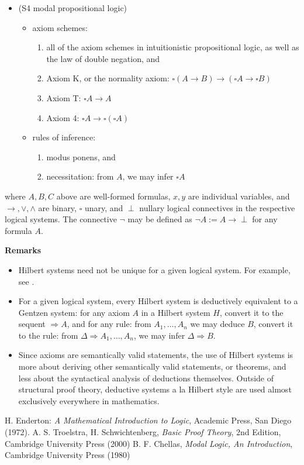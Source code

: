 \documentclass[12pt]{article}
\begin{document}
\begin{itemize}
\begin{itemize}
\begin{enumerate}
\end{enumerate}
\end{itemize}
\item (S4 modal propositional logic)
\begin{itemize}
\item axiom schemes:
\begin{enumerate}
\item all of the axiom schemes in intuitionistic propositional logic, as well as the law of double negation, and
\item Axiom K, or the normality axiom: $\square (A\to B) \to (\square A \to \square B)$
\item Axiom T: $\square A \to A$
\item Axiom 4: $\square A \to \square (\square A)$
\end{enumerate}
\item rules of inference: 
\begin{enumerate}
\item modus ponens, and
\item necessitation: from $A$, we may infer $\square A$
\end{enumerate}
\end{itemize}
\end{itemize}
where $A,B,C$ above are well-formed formulas, $x,y$ are individual variables, and $\to,\vee,\wedge$ are binary, $\square$ unary, and $\perp$ nullary logical connectives in the respective logical systems.  The connective $\neg$ may be defined as $\neg A:=A\to \perp$ for any formula $A$.

\textbf{Remarks}
\begin{itemize}
\item
Hilbert systems need not be unique for a given logical system.  For example, see .
\item
For a given logical system, every Hilbert system is deductively equivalent to a Gentzen system: for any axiom $A$ in a Hilbert system $H$, convert it to the sequent $\Rightarrow A$, and for any rule: from $A_1,\ldots,A_n$ we may deduce $B$, convert it to the rule: from $\Delta\Rightarrow A_1,\ldots,A_n$, we may infer $\Delta \Rightarrow B$.
\item
Since axioms are semantically valid statements, the use of Hilbert systems is more about deriving other semantically valid statements, or theorems, and less about the syntactical analysis of deductions themselves.  Outside of structural proof theory, deductive systems a la Hilbert style are used almost exclusively everywhere in mathematics.
\end{itemize}

\begin{thebibliography}{7}
 H. Enderton: {\em A Mathematical Introduction to Logic}, Academic Press, San Diego (1972).
 A. S. Troelstra, H. Schwichtenberg, {\it Basic Proof Theory}, 2nd Edition, Cambridge University Press (2000)
 B. F. Chellas, {\it Modal Logic, An Introduction}, Cambridge University Press (1980)
\end{thebibliography}
\end{document}
